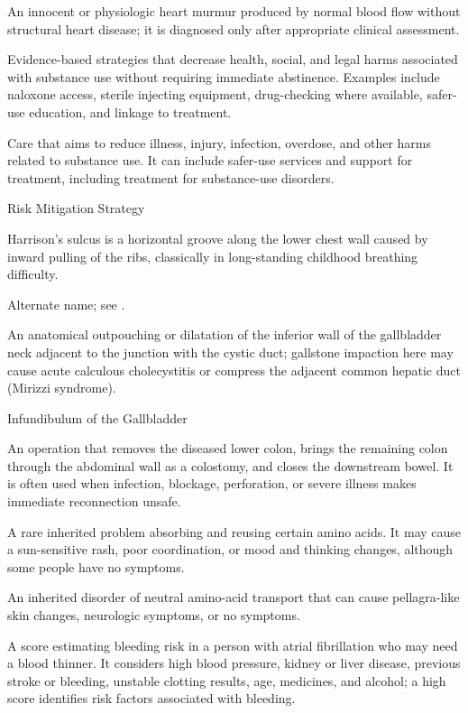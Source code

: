  An innocent or physiologic heart murmur produced by normal blood flow without structural heart disease; it is diagnosed only after appropriate clinical assessment.

 Evidence-based strategies that decrease health, social, and legal harms associated with
substance use without requiring immediate abstinence. Examples include naloxone access,
sterile injecting equipment, drug-checking where available, safer-use education, and
linkage to treatment.

 Care that aims to reduce illness, injury, infection, overdose, and other harms related to substance use. It can include safer-use services and support for treatment, including treatment for substance-use disorders.

\synonyms
Risk Mitigation Strategy

 Harrison's sulcus is a horizontal groove along the lower chest wall caused by inward pulling of the ribs, classically in long-standing childhood breathing difficulty.

 Alternate name; see .

 An anatomical outpouching or dilatation of the inferior wall of the gallbladder neck adjacent to the junction with the cystic duct; gallstone impaction here may cause acute calculous cholecystitis or compress the adjacent common hepatic duct (Mirizzi syndrome).

\synonyms
Infundibulum of the Gallbladder

 An operation that removes the diseased lower colon, brings the remaining colon through the abdominal wall as a colostomy, and closes the downstream bowel. It is often used when infection, blockage, perforation, or severe illness makes immediate reconnection unsafe.

 A rare inherited problem absorbing and reusing certain amino acids. It may cause a sun-sensitive rash, poor coordination, or mood and thinking changes, although some people have no symptoms.

 An inherited disorder of neutral amino-acid transport that can cause pellagra-like skin changes, neurologic symptoms, or no symptoms.

 A score estimating bleeding risk in a person with atrial fibrillation who may need a blood thinner. It considers high blood pressure, kidney or liver disease, previous stroke or bleeding, unstable clotting results, age, medicines, and alcohol; a high score identifies risk factors associated with bleeding.

